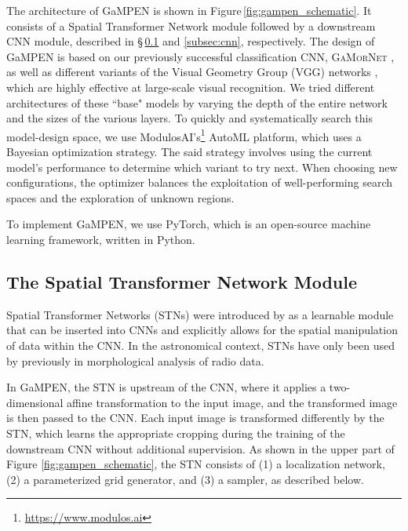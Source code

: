\documentclass[twocolumn]{aastex63}
\newcommand\gamornet{G\textsc{a}M\textsc{or}N\textsc{et}}
\newcommand\gampen{GaMPEN}
\begin{document}
\begin{CJK*}{UTF8}{gbsn}
The architecture of \gampen{} is shown in Figure\,\ref{fig:gampen_schematic}. It consists of a Spatial Transformer Network module followed by a downstream CNN module, described in \S\,\ref{subsec:STN} and \ref{subsec:cnn}, respectively. The design of \gampen{} is based on our previously successful classification CNN, \gamornet{} \citep{Ghosh2020GalaxyGalaxies}, as well as different variants of the Visual Geometry Group (VGG) networks \citep{vgg}, which are highly effective at large-scale visual recognition. We tried different architectures of these ``base" models by varying the depth of the entire network and the sizes of the various layers. To quickly and systematically search this model-design space, we use ModulosAI's\footnote{\href{https://www.modulos.ai}{https://www.modulos.ai}} AutoML platform, which uses a Bayesian optimization strategy. The said strategy involves using the current model's performance to determine which variant to try next. When choosing new configurations, the optimizer balances the exploitation of well-performing search spaces and the exploration of unknown regions.

To implement \gampen{}, we use PyTorch,
 which is an open-source machine learning framework, written in Python.

\subsection{The Spatial Transformer Network Module } \label{subsec:STN}
Spatial Transformer Networks (STNs) were introduced by \cite{jarderberg_15} as a learnable module that can be inserted into CNNs and explicitly allows for the spatial manipulation of data within the CNN. In the astronomical context, STNs have only been used by \cite{wu_2019} previously in morphological analysis of radio data. 

In \gampen{}, the STN is upstream of the CNN, where it applies a two-dimensional affine transformation to the input image, and the transformed image is then passed to the CNN. 
Each input image is transformed differently by the STN, which 
learns the appropriate cropping during the training of the downstream CNN without additional supervision. As shown in the upper part of Figure \ref{fig:gampen_schematic}, the STN consists of (1) a localization network, (2) a parameterized grid generator, and (3) a sampler, as described below.


\end{CJK*}
\end{document}

